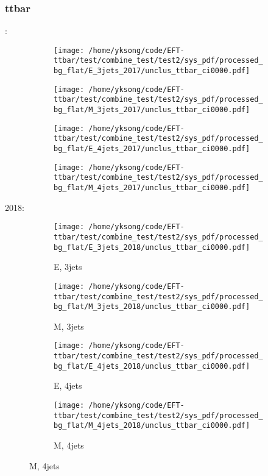\documentclass{beamer}
\begin{document}
\begin{frame}
\frametitle{ttbar}
\fontsize{5}{1}:
\begin{figure}
\centering
\begin{subfigure}[b]{0.24\textwidth}
\texttt{[image: /home/yksong/code/EFT-ttbar/test/combine\_test/test2/sys\_pdf/processed\_bg\_flat/E\_3jets\_2017/unclus\_ttbar\_ci0000.pdf]}
\end{subfigure}
\begin{subfigure}[b]{0.24\textwidth}
\texttt{[image: /home/yksong/code/EFT-ttbar/test/combine\_test/test2/sys\_pdf/processed\_bg\_flat/M\_3jets\_2017/unclus\_ttbar\_ci0000.pdf]}
\end{subfigure}
\begin{subfigure}[b]{0.24\textwidth}
\texttt{[image: /home/yksong/code/EFT-ttbar/test/combine\_test/test2/sys\_pdf/processed\_bg\_flat/E\_4jets\_2017/unclus\_ttbar\_ci0000.pdf]}
\end{subfigure}
\begin{subfigure}[b]{0.24\textwidth}
\texttt{[image: /home/yksong/code/EFT-ttbar/test/combine\_test/test2/sys\_pdf/processed\_bg\_flat/M\_4jets\_2017/unclus\_ttbar\_ci0000.pdf]}
\end{subfigure}
\end{figure}
2018:
\begin{figure}
\centering
\begin{subfigure}[b]{0.24\textwidth}
\texttt{[image: /home/yksong/code/EFT-ttbar/test/combine\_test/test2/sys\_pdf/processed\_bg\_flat/E\_3jets\_2018/unclus\_ttbar\_ci0000.pdf]}
\captionsetup{font=tiny}
\caption{E, 3jets}
\end{subfigure}
\begin{subfigure}[b]{0.24\textwidth}
\texttt{[image: /home/yksong/code/EFT-ttbar/test/combine\_test/test2/sys\_pdf/processed\_bg\_flat/M\_3jets\_2018/unclus\_ttbar\_ci0000.pdf]}
\captionsetup{font=tiny}
\caption{M, 3jets}
\end{subfigure}
\begin{subfigure}[b]{0.24\textwidth}
\texttt{[image: /home/yksong/code/EFT-ttbar/test/combine\_test/test2/sys\_pdf/processed\_bg\_flat/E\_4jets\_2018/unclus\_ttbar\_ci0000.pdf]}
\captionsetup{font=tiny}
\caption{E, 4jets}
\end{subfigure}
\begin{subfigure}[b]{0.24\textwidth}
\texttt{[image: /home/yksong/code/EFT-ttbar/test/combine\_test/test2/sys\_pdf/processed\_bg\_flat/M\_4jets\_2018/unclus\_ttbar\_ci0000.pdf]}
\captionsetup{font=tiny}
\caption{M, 4jets}
\end{subfigure}
\end{figure}
\end{frame}
\end{document}
